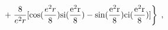 \begin{equation}
\left. +\; \frac{8}{e^2 r} [ \cos(\frac{e^2r}{8}) 
\rm{si}(\frac{e^2r}{8})-  \sin(\frac{e^2r}{8}) \rm{ci}(\frac{e^2r}{8})]
\right\} \;,
\end{equation}

